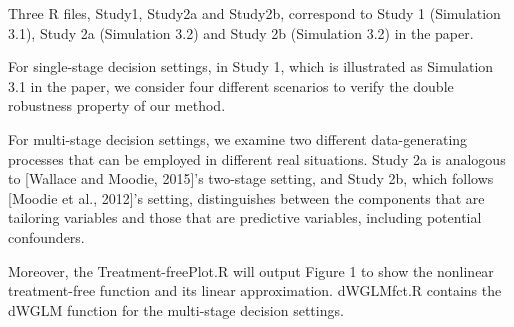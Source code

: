 Three R files, Study1, Study2a and Study2b, correspond to Study 1 (Simulation 3.1), Study 2a (Simulation 3.2) and Study 2b (Simulation 3.2) in the paper. 

For single-stage decision settings, in Study 1, which is illustrated as Simulation 3.1 in the paper, we consider four different scenarios to verify the double robustness property of our method.

For multi-stage decision settings, we examine two different data-generating processes that can be employed in different real situations. Study 2a is analogous to [Wallace and Moodie, 2015]’s two-stage setting, and Study 2b, which follows [Moodie et al., 2012]’s setting, distinguishes between the components that are tailoring variables and those that are predictive variables, including potential confounders.

Moreover, the Treatment-freePlot.R will output Figure 1 to show the nonlinear treatment-free function and its linear approximation. dWGLMfct.R contains the dWGLM function for the multi-stage decision settings.
